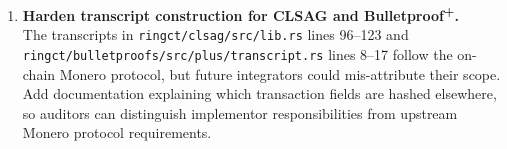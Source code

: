 \documentclass[12pt,a4paper]{article}
\begin{document}
\begin{enumerate}[label=\textbf{A\arabic*.}]


    \item \textbf{Harden transcript construction for CLSAG and
          Bulletproof\textsuperscript{+}.}\\
          The transcripts in
          \texttt{ringct/clsag/src/lib.rs} lines 96–123 and\\
          \texttt{ringct/bulletproofs/src/plus/transcript.rs} lines 8–17
          follow the on-chain Monero protocol, but future integrators
          could mis-attribute their scope.
          Add documentation explaining
          which transaction fields are hashed elsewhere, so auditors can
          distinguish implementor responsibilities from upstream Monero protocol requirements.



\end{enumerate}
\end{document}
